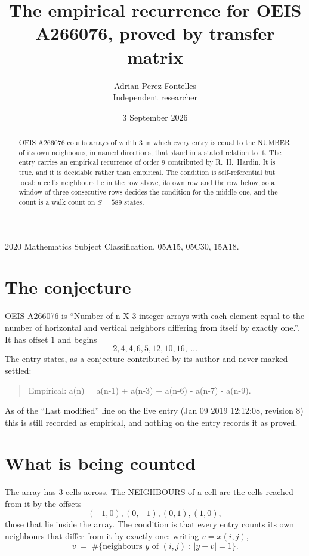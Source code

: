 \documentclass[11pt,a4paper]{article}
\title{The empirical recurrence for OEIS A266076, proved by transfer matrix}
\author{Adrian Perez Fontelles\\ \small Independent researcher}
\date{3 September 2026}
\theoremstyle{plain}
\theoremstyle{definition}
\begin{document}
\maketitle

\begin{abstract}
OEIS A266076 counts arrays of width $3$ in which every entry is equal to the NUMBER of its own
neighbours, in named directions, that stand in a stated relation to it. The entry carries an
empirical recurrence of order $9$ contributed by R.~H.~Hardin. It is true, and it is
decidable rather than empirical. The condition is self-referential but local: a cell's
neighbours lie in the row above, its own row and the row below, so a window of three
consecutive rows decides the condition for the middle one, and the count is a walk count on
$S=589$ states.
\end{abstract}

\noindent\small 2020 Mathematics Subject Classification. 05A15, 05C30, 15A18.\normalsize

\section{The conjecture}

OEIS A266076 is ``Number of n X 3 integer arrays with each element equal to the number of horizontal and vertical neighbors differing from itself by exactly one.''. It has offset $1$ and begins
\[
2, 4, 4, 6, 5, 12, 10, 16,\ \dots
\]
The entry states, as a conjecture contributed by its author and never marked settled:
\begin{quote}
Empirical: a(n) = a(n-1) + a(n-3) + a(n-6) - a(n-7) - a(n-9).
\end{quote}
As of the ``Last modified'' line on the live entry (Jan 09 2019 12:12:08, revision 8) this is still
recorded as empirical, and nothing on the entry records it as proved.

\section{What is being counted}

The array has $3$ cells across. The NEIGHBOURS of a cell are the cells reached from it by the
offsets
\[
(-1,0), (0,-1), (0,1), (1,0),
\]
those that lie inside the array. The condition is that every entry counts its own neighbours
that differ from it by exactly one: writing $v=x(i,j)$,
\[
v\;=\;\#\{\text{neighbours } y \text{ of } (i,j)\ :\ \lvert y-v\rvert=1\} .
\]
\end{document}
